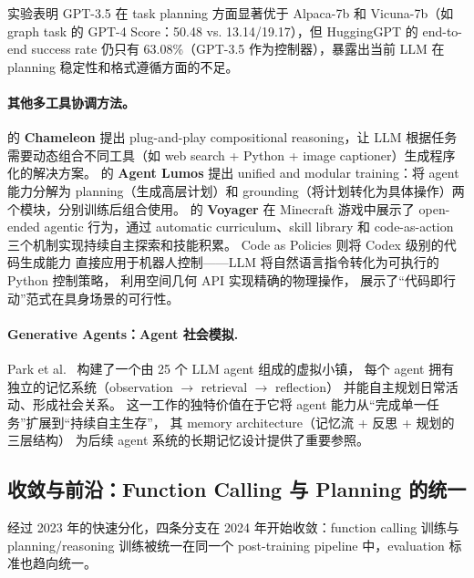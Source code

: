 实验表明 GPT-3.5 在 task planning 方面显著优于 Alpaca-7b 和 Vicuna-7b（如 graph task 的 GPT-4 Score：50.48 vs. 13.14/19.17），但 HuggingGPT 的 end-to-end success rate 仍只有 63.08\%（GPT-3.5 作为控制器），暴露出当前 LLM 在 planning 稳定性和格式遵循方面的不足。

\paragraph{其他多工具协调方法。}
\citet{lu2023chameleon} 的 \textbf{Chameleon} 提出 plug-and-play compositional reasoning，让 LLM 根据任务需要动态组合不同工具（如 web search + Python + image captioner）生成程序化的解决方案。
\citet{yin2023agentlumos} 的 \textbf{Agent Lumos} 提出 unified and modular training：将 agent 能力分解为 planning（生成高层计划）和 grounding（将计划转化为具体操作）两个模块，分别训练后组合使用。
\citet{wang2023voyager} 的 \textbf{Voyager} 在 Minecraft 游戏中展示了 open-ended agentic 行为，通过 automatic curriculum、skill library 和 code-as-action 三个机制实现持续自主探索和技能积累。
Code as Policies \cite{liang2023codepolicies} 则将 Codex 级别的代码生成能力
直接应用于机器人控制——LLM 将自然语言指令转化为可执行的 Python 控制策略，
利用空间几何 API 实现精确的物理操作，
展示了``代码即行动''范式在具身场景的可行性。

\paragraph{Generative Agents：Agent 社会模拟.}
Park et al.\ \cite{park2023generativeagents} 构建了一个由 25 个 LLM agent 组成的虚拟小镇，
每个 agent 拥有独立的记忆系统（observation $\rightarrow$ retrieval $\rightarrow$ reflection）
并能自主规划日常活动、形成社会关系。
这一工作的独特价值在于它将 agent 能力从``完成单一任务''扩展到``持续自主生存''，
其 memory architecture（记忆流 + 反思 + 规划的三层结构）
为后续 agent 系统的长期记忆设计提供了重要参照。


\subsection{收敛与前沿：Function Calling 与 Planning 的统一}
\label{sec:t6-convergence}

经过 2023 年的快速分化，四条分支在 2024 年开始收敛：function calling 训练与 planning/reasoning 训练被统一在同一个 post-training pipeline 中，evaluation 标准也趋向统一。

